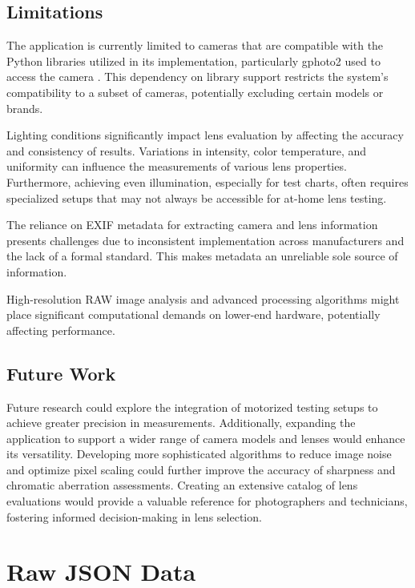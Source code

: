 \section{Limitations}
The application is currently limited to cameras that are compatible with the Python libraries utilized in its implementation, particularly gphoto2 used to access the camera \cite{gphoto2_compatible}. This dependency on library support restricts the system’s compatibility to a subset of cameras, potentially excluding certain models or brands.

Lighting conditions significantly impact lens evaluation by affecting the accuracy and consistency of results. Variations in intensity, color temperature, and uniformity can influence the measurements of various lens properties. Furthermore, achieving even illumination, especially for test charts, often requires specialized setups that may not always be accessible for at-home lens testing.

The reliance on EXIF metadata for extracting camera and lens information presents challenges due to inconsistent implementation across manufacturers and the lack of a formal standard. This makes metadata an unreliable sole source of information.

High-resolution RAW image analysis and advanced processing algorithms might place significant computational demands on lower-end hardware, potentially affecting performance.

\section{Future Work}

Future research could explore the integration of motorized testing setups to achieve greater precision in measurements. Additionally, expanding the application to support a wider range of camera models and lenses would enhance its versatility. Developing more sophisticated algorithms to reduce image noise and optimize pixel scaling could further improve the accuracy of sharpness and chromatic aberration assessments. Creating an extensive catalog of lens evaluations would provide a valuable reference for photographers and technicians, fostering informed decision-making in lens selection.

\appendix

\chapter{Raw JSON Data}

